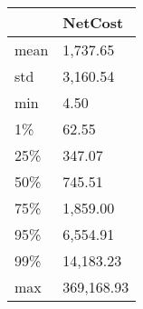 \begin{tabular}{ll}
\toprule
{} &     NetCost \\
\midrule
mean &    1,737.65 \\
std  &    3,160.54 \\
min  &        4.50 \\
1\%   &       62.55 \\
25\%  &      347.07 \\
50\%  &      745.51 \\
75\%  &    1,859.00 \\
95\%  &    6,554.91 \\
99\%  &   14,183.23 \\
max  &  369,168.93 \\
\bottomrule
\end{tabular}

